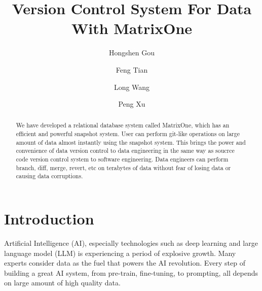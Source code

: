 \documentclass[sigconf,nonacm]{acmart} %
\begin{document}
\title{Version Control System For Data With MatrixOne}

\author{Hongshen Gou}

\author{Feng Tian}

\author{Long Wang}

\author{Peng Xu}

\begin{abstract}
We have developed a relational database system called MatrixOne, which has 
an efficient and powerful snapshot system.  User can perform git-like operations on 
large amount of data almost instantly using the snapshot system. 
This brings the power and convenience 
of data version control to data engineering in the same way as soucrce code 
version control system to software engineering.
Data engineers can perform branch, diff, merge, revert, etc on terabytes of data 
without fear of losing data or causing data corruptions.
\end{abstract}

\maketitle

\section{Introduction}\label{sec:intro}
Artificial Intelligence (AI), especially technologies such as deep learning 
and large language model (LLM) is experiencing a period of explosive 
growth.  Many experts consider data as the fuel that powers the AI revolution.
Every step of building a great AI system, from pre-train, fine-tuning, to prompting, all 
depends on large amount of high quality data.
\end{document}
